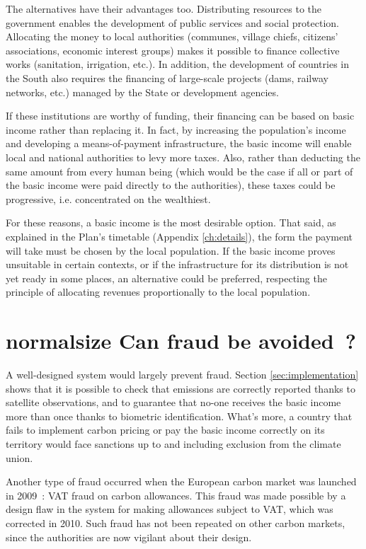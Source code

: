 \documentclass[a5paper,french,openany]{memoir}
\begin{document}
The alternatives have their advantages too. Distributing resources to the government enables the development of public services and social protection. Allocating the money to local authorities (communes, village chiefs, citizens' associations, economic interest groups) makes it possible to finance collective works (sanitation, irrigation, etc.). In addition, the development of countries in the South also requires the financing of large-scale projects (dams, railway networks, etc.) managed by the State or development agencies. 

If these institutions are worthy of funding, their financing can be based on 
basic income rather than replacing it. In fact, by increasing the population's income and developing a means-of-payment infrastructure, the basic income will enable local and national authorities to levy more taxes. Also, rather than deducting the same amount from every human being (which would be the case if all or part of the basic income were paid directly to the authorities), these taxes could be progressive, i.e. concentrated on the wealthiest. 

For these reasons, a basic income is the most desirable option. That said, as explained in the Plan's timetable (Appendix \ref{ch:details}), the form the payment will take must be chosen by the local population. If the basic income proves unsuitable in certain contexts, or if the infrastructure for its distribution is not yet ready in some places, an alternative could be preferred, respecting the principle of allocating revenues proportionally to the local population. 

\section*{normalsize Can fraud be avoided~?}\label{q:fraud}

A well-designed system would largely prevent fraud. Section \ref{sec:implementation} shows that it is possible to check that emissions are correctly reported thanks to satellite observations, and to guarantee that no-one receives the basic income more than once thanks to biometric identification. What's more, a country that fails to implement carbon pricing or pay the basic income correctly on its territory would face sanctions up to and including exclusion from the climate union. 

Another type of fraud occurred when the European carbon market was launched in 2009~: VAT fraud on carbon allowances. This fraud was made possible by a design flaw in the system for making allowances subject to VAT, which was corrected in 2010. Such fraud has not been repeated on other carbon markets, since the authorities are now vigilant about their design.
\end{document}
